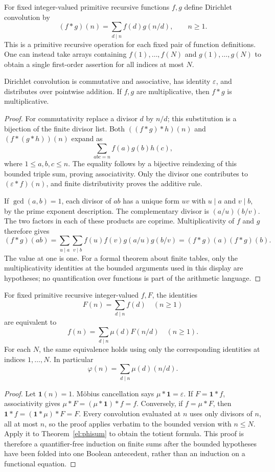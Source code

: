 For fixed integer-valued primitive recursive functions $f,g$ define
Dirichlet convolution by
\[
                  (f*g)(n)=\sum_{d\mid n} f(d)g(n/d),\qquad n\ge1.
\]
This is a primitive recursive operation for each fixed pair of function
definitions.  One can instead take arrays containing $f(1),\ldots,f(N)$
and $g(1),\ldots,g(N)$ to obtain a single first-order assertion for
all indices at most $N$.

\begin{theorem}
\label{el:convolution}
Dirichlet convolution is commutative and associative, has identity
$\varepsilon$, and distributes over pointwise addition.  If $f,g$
are multiplicative, then $f*g$ is multiplicative.
\end{theorem}
\begin{proof}
For commutativity replace a divisor $d$ by $n/d$; this substitution
is a bijection of the finite divisor list.  Both
$((f*g)*h)(n)$ and $(f*(g*h))(n)$ expand as
\[
                   \sum_{abc=n}f(a)g(b)h(c),
\]
where $1\le a,b,c\le n$.  The equality follows by a bijective
reindexing of this bounded triple sum, proving associativity.
Only the divisor one contributes to $(\varepsilon*f)(n)$, and
finite distributivity proves the additive rule.

If $\gcd(a,b)=1$, each divisor of $ab$ has a unique form $uv$ with
$u\mid a$ and $v\mid b$, by the prime exponent description.  The
complementary divisor is $(a/u)(b/v)$.  The two factors in each of
these products are coprime.  Multiplicativity of $f$ and $g$ therefore
gives
\[
 (f*g)(ab)=\sum_{u\mid a}\sum_{v\mid b}
 f(u)f(v)g(a/u)g(b/v)=(f*g)(a)(f*g)(b).
\]
The value at one is one.  For a formal theorem about finite tables,
only the multiplicativity identities at the bounded arguments used
in this display are hypotheses; no quantification over functions is
part of the arithmetic language.
\end{proof}

\begin{theorem}\label{el:mobius}
For fixed primitive recursive integer-valued $f,F$, the identities
\[
 F(n)=\sum_{d\mid n}f(d)\quad(n\ge1)
\]
are equivalent to
\[
 f(n)=\sum_{d\mid n}\mu(d)F(n/d)\quad(n\ge1).
\]
For each $N$, the same equivalence holds using only the corresponding
identities at indices $1,\ldots,N$.  In particular
\[
                   \varphi(n)=\sum_{d\mid n}\mu(d)(n/d).
\]
\end{theorem}
\begin{proof}
Let $\mathbf1(n)=1$.  M\"obius cancellation says
$\mu*\mathbf1=\varepsilon$.  If $F=\mathbf1*f$, associativity gives
$\mu*F=(\mu*\mathbf1)*f=f$.  Conversely, if $f=\mu*F$, then
$\mathbf1*f=(\mathbf1*\mu)*F=F$.
Every convolution evaluated at $n$ uses only divisors of $n$, all at
most $n$, so the proof applies verbatim to the bounded version with
$n\le N$.  Apply it to Theorem~\ref{el:phisum} to obtain the totient
formula.  This proof is therefore a quantifier-free induction on
finite sums after the bounded hypotheses have been folded into one
Boolean antecedent, rather than an induction on a functional equation.
\end{proof}

